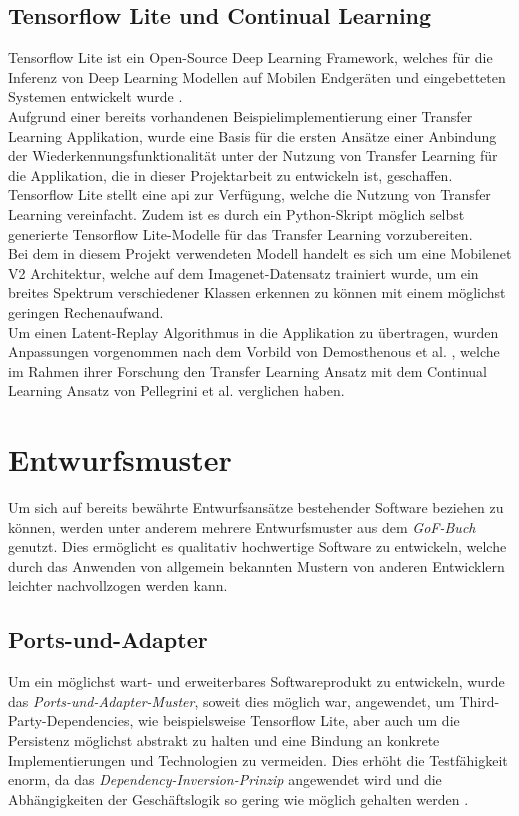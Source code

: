 \documentclass[oneside]{ausarbeitung}
\begin{document}
\subsection{Tensorflow Lite und Continual Learning}
Tensorflow Lite ist ein Open-Source Deep Learning Framework, welches für die Inferenz von Deep Learning Modellen auf Mobilen Endgeräten und eingebetteten Systemen entwickelt wurde \cite{tflite-site}.\\
Aufgrund einer bereits vorhandenen Beispielimplementierung einer Transfer Learning Applikation, wurde eine Basis für die ersten Ansätze einer Anbindung der Wiederkennungsfunktionalität unter der Nutzung von Transfer Learning für die Applikation, die in dieser Projektarbeit zu entwickeln ist, geschaffen.
Tensorflow Lite stellt eine \ac{api} zur Verfügung, welche die Nutzung von Transfer Learning vereinfacht. Zudem ist es durch ein Python-Skript möglich selbst generierte Tensorflow Lite-Modelle für das Transfer Learning vorzubereiten.\\
Bei dem in diesem Projekt verwendeten Modell handelt es sich um eine Mobilenet V2 Architektur, welche auf dem Imagenet-Datensatz trainiert wurde, um ein breites Spektrum verschiedener Klassen erkennen zu können mit einem möglichst geringen Rechenaufwand.\\
Um einen Latent-Replay Algorithmus in die Applikation zu übertragen, wurden Anpassungen vorgenommen nach dem Vorbild von Demosthenous et al. \cite{cl-vs-tl}, welche im Rahmen ihrer Forschung den Transfer Learning Ansatz mit dem Continual Learning Ansatz von Pellegrini et al. \cite{Pellegrini2019} verglichen haben.
\section{Entwurfsmuster}
Um sich auf bereits bewährte Entwurfsansätze bestehender Software beziehen zu können, werden unter anderem mehrere Entwurfsmuster aus dem \textit{GoF-Buch} genutzt. Dies ermöglicht es qualitativ hochwertige Software zu entwickeln, welche durch das Anwenden von allgemein bekannten Mustern von anderen Entwicklern leichter nachvollzogen werden kann.
\subsection{Ports-und-Adapter}
Um ein möglichst wart- und erweiterbares Softwareprodukt zu entwickeln, wurde das \textit{Ports-und-Adapter-Muster}, soweit dies möglich war, angewendet, um Third-Party-Dependencies, wie beispielsweise Tensorflow Lite, aber auch um die Persistenz möglichst abstrakt zu halten und eine Bindung an konkrete Implementierungen und Technologien zu vermeiden. Dies erhöht die Testfähigkeit enorm, da das \textit{Dependency-Inversion-Prinzip} angewendet wird und die Abhängigkeiten der Geschäftslogik so gering wie möglich gehalten werden .
\end{document}
